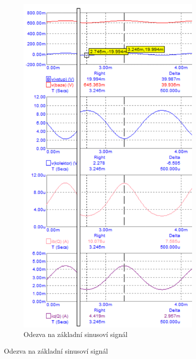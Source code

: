 \documentclass{article}
\begin{document}
\begin{figure}[H]
\begin{minipage}[t]{0.45\textwidth}
\begin{figure}[H]
      \includegraphics[width=\textwidth]{PC/BJT/sim_1.png}
      \caption{\label{prac_bod_sim_1} Odezva na základní sinusoví signál}
    \end{figure}
  \end{minipage}
\end{figure}
\end{document}
